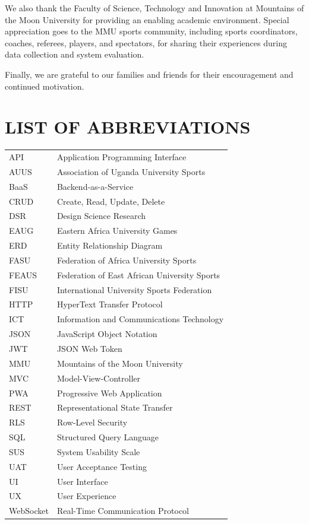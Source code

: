 \documentclass[12pt,a4paper]{report}
\begin{document}
We also thank the Faculty of Science, Technology and Innovation at Mountains of the Moon University
for providing an enabling academic environment. Special appreciation goes to the MMU sports community,
including sports coordinators, coaches, referees, players, and spectators, for sharing their experiences
during data collection and system evaluation.

Finally, we are grateful to our families and friends for their encouragement and continued motivation.

\newpage\tableofcontents
\newpage\listoftables{}
\newpage\listoffigures{}

\newpage\chapter*{LIST OF ABBREVIATIONS}
\begin{longtable}{p{3cm}p{11cm}}
API   & Application Programming Interface\\
AUUS  & Association of Uganda University Sports\\
BaaS  & Backend-as-a-Service\\
CRUD  & Create, Read, Update, Delete\\
DSR   & Design Science Research\\
EAUG  & Eastern Africa University Games\\
ERD   & Entity Relationship Diagram\\
FASU  & Federation of Africa University Sports\\
FEAUS & Federation of East African University Sports\\
FISU  & International University Sports Federation\\
HTTP  & HyperText Transfer Protocol\\
ICT   & Information and Communications Technology\\
JSON  & JavaScript Object Notation\\
JWT   & JSON Web Token\\
MMU   & Mountains of the Moon University\\
MVC   & Model-View-Controller\\
PWA   & Progressive Web Application\\
REST  & Representational State Transfer\\
RLS   & Row-Level Security\\
SQL   & Structured Query Language\\
SUS   & System Usability Scale\\
UAT   & User Acceptance Testing\\
UI    & User Interface\\
UX    & User Experience\\
WebSocket & Real-Time Communication Protocol\\
\end{longtable}
\end{document}
